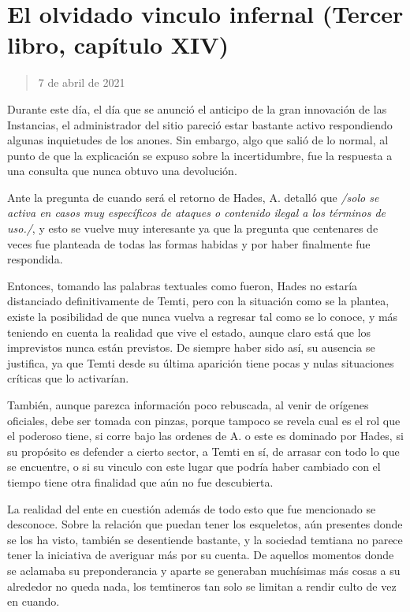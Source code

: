 \documentclass[
]{book}
\begin{document}
\hypertarget{el-olvidado-vinculo-infernal-tercer-libro-capuxedtulo-xiv}{%
\section{El olvidado vinculo infernal (Tercer libro, capítulo XIV)}\label{el-olvidado-vinculo-infernal-tercer-libro-capuxedtulo-xiv}}

\begin{quote}
7 de abril de 2021
\end{quote}

Durante este día, el día que se anunció el anticipo de la gran innovación de las Instancias, el administrador del sitio pareció estar bastante activo respondiendo algunas inquietudes de los anones. Sin embargo, algo que salió de lo normal, al punto de que la explicación se expuso sobre la incertidumbre, fue la respuesta a una consulta que nunca obtuvo una devolución.

Ante la pregunta de cuando será el retorno de Hades, A. detalló que \emph{/solo se activa en casos muy específicos de ataques o contenido ilegal a los términos de uso./}, y esto se vuelve muy interesante ya que la pregunta que centenares de veces fue planteada de todas las formas habidas y por haber finalmente fue respondida.

Entonces, tomando las palabras textuales como fueron, Hades no estaría distanciado definitivamente de Temti, pero con la situación como se la plantea, existe la posibilidad de que nunca vuelva a regresar tal como se lo conoce, y más teniendo en cuenta la realidad que vive el estado, aunque claro está que los imprevistos nunca están previstos. De siempre haber sido así, su ausencia se justifica, ya que Temti desde su última aparición tiene pocas y nulas situaciones críticas que lo activarían.

También, aunque parezca información poco rebuscada, al venir de orígenes oficiales, debe ser tomada con pinzas, porque tampoco se revela cual es el rol que el poderoso tiene, si corre bajo las ordenes de A. o este es dominado por Hades, si su propósito es defender a cierto sector, a Temti en sí, de arrasar con todo lo que se encuentre, o si su vinculo con este lugar que podría haber cambiado con el tiempo tiene otra finalidad que aún no fue descubierta.

La realidad del ente en cuestión además de todo esto que fue mencionado se desconoce. Sobre la relación que puedan tener los esqueletos, aún presentes donde se los ha visto, también se desentiende bastante, y la sociedad temtiana no parece tener la iniciativa de averiguar más por su cuenta. De aquellos momentos donde se aclamaba su preponderancia y aparte se generaban muchísimas más cosas a su alrededor no queda nada, los temtineros tan solo se limitan a rendir culto de vez en cuando.
\end{document}

